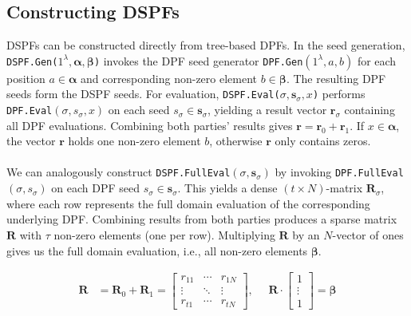 \subsection{Constructing DSPFs}
\label{subseq:constructingTBDSPFs}
DSPFs can be constructed directly from tree-based DPFs. In the seed generation, \texttt{DSPF.Gen($1^\lambda, \boldsymbol{\alpha}, \boldsymbol{\beta}$)} invokes the DPF seed generator \texttt{DPF.Gen}$(1^\lambda, a, b)$ for each position $a \in \boldsymbol{\alpha}$ and corresponding non-zero element $b \in \boldsymbol{\beta}$. The resulting DPF seeds form the DSPF seeds. For evaluation, \texttt{DSPF.Eval($\sigma, \boldsymbol{s}_\sigma, x$)}  performs \texttt{DPF.Eval}$(\sigma, s_\sigma, x)$ on each seed $s_\sigma\in\boldsymbol{s}_\sigma$, yielding a result vector $\boldsymbol{r}_\sigma$ containing all DPF evaluations. Combining both parties' results gives $\boldsymbol{r} = \boldsymbol{r}_0 + \boldsymbol{r}_1$. If $x\in\boldsymbol{\alpha}$, the vector $\boldsymbol{r}$ holds one non-zero element $b$, otherwise $\boldsymbol{r}$ only contains zeros.
\\\\
We can analogously construct \texttt{DSPF.FullEval}$(\sigma, \boldsymbol{s}_\sigma)$ by invoking \texttt{DPF.FullEval}$(\sigma, s_\sigma)$ on each DPF seed $s_\sigma\in\boldsymbol{s}_\sigma$. This yields a dense $(t\times N)$-matrix $\boldsymbol{R}_\sigma$, where each row represents the full domain evaluation of the corresponding underlying DPF. Combining results from both parties produces a sparse matrix $\boldsymbol{R}$ with $\tau$ non-zero elements (one per row).  Multiplying $\boldsymbol{R}$ by an $N$-vector of ones gives us the full domain evaluation, i.e., all non-zero elements $\boldsymbol{\beta}$.

\begin{equation}
\begin{aligned}
\boldsymbol{R} &= \boldsymbol{R}_0 + \boldsymbol{R}_1 = \begin{bmatrix} r_{11} & \cdots & r_{1N} \\ \vdots & \ddots & \vdots \\ r_{t1} & \cdots & r_{tN} \end{bmatrix}, \:\:\:\:\:\:  \boldsymbol{R} \cdot \begin{bmatrix} 1 \\ \vdots \\ 1 \end{bmatrix} = \boldsymbol{\beta}
\end{aligned}
\end{equation}

